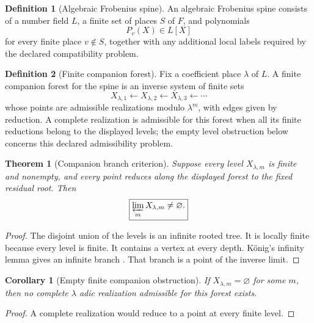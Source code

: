 \documentclass[11pt]{amsart}
\newtheorem{theorem}{Theorem}[section]
\newtheorem{corollary}[corollary]{Corollary}
\theoremstyle{definition}
\newtheorem{definition}[definition]{Definition}
\theoremstyle{remark}
\begin{document}
\begin{definition}[Algebraic Frobenius spine]\label{def:frobenius_spine}
An algebraic Frobenius spine consists of a number field \(L\), a finite set of places \(S\) of \(F\), and polynomials
\[
P_v(X)\in L[X]
\]
for every finite place \(v\notin S\), together with any additional local labels required by the declared compatibility problem.
\end{definition}

\begin{definition}[Finite companion forest]\label{def:companion_forest}
Fix a coefficient place \(\lambda\) of \(L\). A finite companion forest for the spine is an inverse system of finite sets
\[
X_{\lambda,1}
\longleftarrow
X_{\lambda,2}
\longleftarrow
X_{\lambda,3}
\longleftarrow\cdots
\]
whose points are admissible realizations modulo \(\lambda^m\), with edges given by reduction. A complete realization is admissible for this forest when all its finite reductions belong to the displayed levels; the empty level obstruction below concerns this declared admissibility problem.
\end{definition}

\begin{theorem}[Companion branch criterion]\label{thm:companion_branch_criterion}
Suppose every level \(X_{\lambda,m}\) is finite and nonempty, and every point reduces along the displayed forest to the fixed residual root. Then
\[
\boxed{
\varprojlim_mX_{\lambda,m}
\neq\varnothing.
}
\]
\end{theorem}

\begin{proof}
The disjoint union of the levels is an infinite rooted tree. It is locally finite because every level is finite. It contains a vertex at every depth. König's infinity lemma gives an infinite branch \cite{Diestel2017}. That branch is a point of the inverse limit.
\end{proof}

\begin{corollary}[Empty finite companion obstruction]\label{cor:empty_companion_obstruction}
If \(X_{\lambda,m}=\varnothing\) for some \(m\), then no complete \(\lambda\) adic realization admissible for this forest exists.
\end{corollary}

\begin{proof}
A complete realization would reduce to a point at every finite level.
\end{proof}
\end{document}
